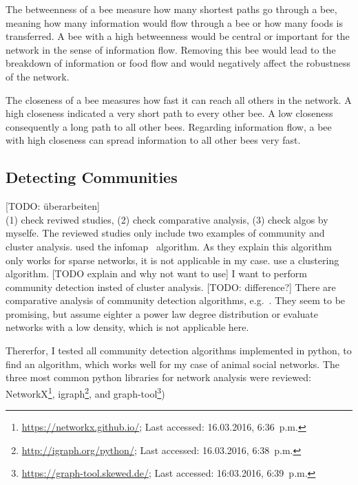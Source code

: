 The betweenness of a bee measure how many shortest paths go through a bee, meaning how many information would flow through a bee or how many foods is transferred. A bee with a high betweenness would be central or important for the network in the sense of information flow. Removing this bee would lead to the breakdown of information or food flow and would negatively affect the robustness of the network.

The closeness of a bee measures how fast it can reach all others in the network. A high closeness indicated a very short path to every other bee. A low closeness consequently a long path to all other bees. Regarding information flow, a bee with high closeness can spread information to all other bees very fast.



\subsection{Detecting Communities}
\label{subsec:APcommunityDet}
[TODO: überarbeiten]\\
(1) check reviwed studies, (2) check comparative analysis, (3) check algos by myselfe.
The reviewed studies only include two examples of community and cluster analysis.
\textcite{mersch2013tracking} used the infomap~\cite{rosvall2009map,rosvall2007information} algorithm. As they explain this algorithm only works for sparse networks, it is not applicable in my case. \textcite{baracchi2014socio} use a clustering algorithm. [TODO explain and why not want to use] I want to perform community detection insted of cluster analysis. [TODO: difference?]
There are comparative analysis of community detection algorithms, e.g.~\cite{yang2016comparative, harenberg2014community}. They seem to be promising, but assume eighter a power law degree distribution or evaluate networks with a low density, which is not applicable here.

Thererfor, I tested all community detection algorithms implemented in python, to find an algorithm, which works well for my case of animal social networks. The three most common python libraries for network analysis were reviewed: NetworkX\footnote{\url{https://networkx.github.io/}; Last accessed: 16.03.2016, 6:36~p.m.}, igraph\footnote{\url{http://igraph.org/python/}; Last accessed: 16.03.2016, 6:38~p.m.}, and graph-tool\footnote{\url{https://graph-tool.skewed.de/}; Last accessed: 16:03.2016, 6:39~p.m.})

